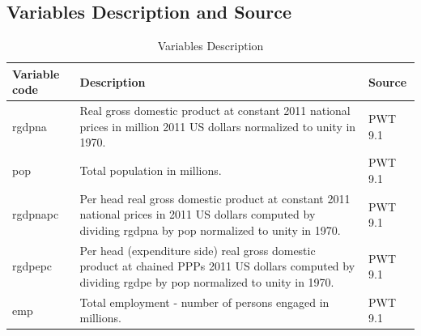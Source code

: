 \documentclass[12pt]{article}
\begin{document}
\begin{appendices}
\subsection{Variables Description and Source}
\begin{table}[!htbp] 
\centering
\footnotesize
\caption{\label{TA_Description} Variables Description}\centering\medskip
\begin{tabular}{p{2cm}p{9cm}p{3.5cm}}
\hline
 Variable code & Description & Source \\ 
 \hline \hline
 rgdpna & Real gross domestic product at constant 2011 national prices in million 2011 US dollars normalized to unity in 1970. & PWT 9.1 \\ \hline
 pop & Total population in millions. & PWT 9.1  \\ \hline
 rgdpnapc & Per head real gross domestic product at constant 2011 national prices in 2011 US dollars computed by dividing rgdpna by pop normalized to unity in 1970. & PWT 9.1 \\ \hline
 rgdpepc & Per head (expenditure side) real gross domestic product at chained PPPs 2011 US dollars computed by dividing rgdpe by pop normalized to unity in 1970. & PWT 9.1 \\ \hline
 emp & Total employment - number of persons engaged in millions. & PWT 9.1\\ \hline

\end{tabular}
\end{table}
\end{appendices}
\end{document}

